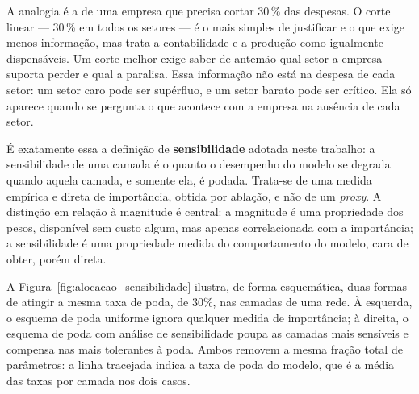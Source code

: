 A analogia é a de uma empresa que precisa cortar 30\,\% das despesas. O corte linear ---
30\,\% em todos os setores --- é o mais simples de justificar e o que exige menos
informação, mas trata a contabilidade e a produção como igualmente dispensáveis. Um corte
melhor exige saber de antemão qual setor a empresa suporta perder e qual a paralisa. Essa
informação não está na despesa de cada setor: um setor caro pode ser supérfluo, e um
setor barato pode ser crítico. Ela só aparece quando se pergunta o que acontece com a
empresa na ausência de cada setor.

É exatamente essa a definição de \textbf{sensibilidade} adotada neste trabalho: a
sensibilidade de uma camada é o quanto o desempenho do modelo se degrada quando aquela
camada, e somente ela, é podada. Trata-se de uma medida empírica e direta de importância,
obtida por ablação, e não de um \textit{proxy}. A distinção em relação à magnitude é
central: a magnitude é uma propriedade dos pesos, disponível sem custo algum, mas apenas
correlacionada com a importância; a sensibilidade é uma propriedade medida do
comportamento do modelo, cara de obter, porém direta.

A Figura~\ref{fig:alocacao_sensibilidade} ilustra, de forma esquemática, duas formas de
atingir a mesma taxa de poda, de 30\%, nas camadas de uma rede. À esquerda, o esquema de
poda uniforme ignora qualquer medida de importância; à direita, o esquema de poda com análise
de sensibilidade poupa as camadas mais sensíveis e compensa nas mais tolerantes à poda.
Ambos removem a mesma fração total de parâmetros: a linha tracejada indica a taxa de poda do
modelo, que é a média das taxas por camada nos dois casos.

